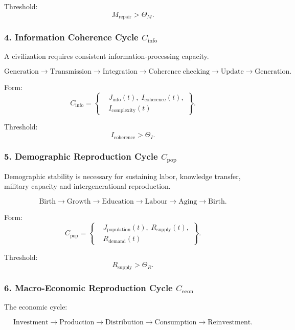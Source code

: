 Threshold:
\[
  M_{\mathrm{repair}} > \Theta_M.
\]

\subsubsection{4. Information Coherence Cycle $C_{\mathrm{info}}$}

A civilization requires consistent information-processing capacity.

\[
  \mathrm{Generation}
  \to
  \mathrm{Transmission}
  \to
  \mathrm{Integration}
  \to
  \mathrm{Coherence\;checking}
  \to
  \mathrm{Update}
  \to
  \mathrm{Generation}.
\]

Form:
\[
  C_{\mathrm{info}}
  =
  \left\{
  \begin{aligned}
    &J_{\mathrm{info}}(t),\;
     I_{\mathrm{coherence}}(t),\\
    &I_{\mathrm{complexity}}(t)
  \end{aligned}
  \right\}.
\]

Threshold:
\[
  I_{\mathrm{coherence}} > \Theta_I.
\]

\subsubsection{5. Demographic Reproduction Cycle $C_{\mathrm{pop}}$}

Demographic stability is necessary for sustaining labor, knowledge transfer,
military capacity and intergenerational reproduction.

\[
  \mathrm{Birth}
  \to
  \mathrm{Growth}
  \to
  \mathrm{Education}
  \to
  \mathrm{Labour}
  \to
  \mathrm{Aging}
  \to
  \mathrm{Birth}.
\]

Form:
\[
  C_{\mathrm{pop}}
    =
    \left\{
    \begin{aligned}
      &J_{\mathrm{population}}(t),\;
       R_{\mathrm{supply}}(t),\\
      &R_{\mathrm{demand}}(t)
    \end{aligned}
    \right\}.
\]

Threshold:
\[
  R_{\mathrm{supply}} > \Theta_R.
\]

\subsubsection{6. Macro-Economic Reproduction Cycle $C_{\mathrm{econ}}$}

The economic cycle:

\[
  \mathrm{Investment}
  \to
  \mathrm{Production}
  \to
  \mathrm{Distribution}
  \to
  \mathrm{Consumption}
  \to
  \mathrm{Reinvestment}.
\]

